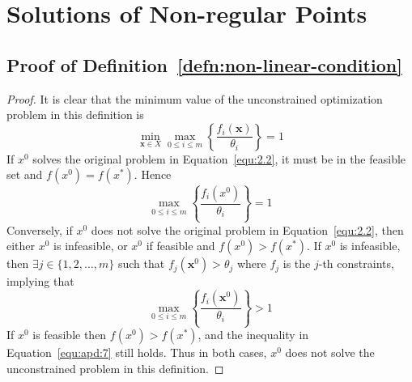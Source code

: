 \section{Solutions of Non-regular Points}
\subsection{Proof of Definition~\ref{defn:non-linear-condition}}
\label{appendix:defn5.1}
\begin{proof}
    It is clear that the minimum value of the unconstrained optimization problem in this definition is
    \begin{equation}
        \min _{\mathbf{x} \in X} \max _{0 \leq i \leq m}\left\{\frac{f_{i}(\mathbf{x})}{\theta_{i}}\right\}=1
    \end{equation}
    If $x^0$ solves the original problem in Equation~\ref{equ:2.2}, it must be in the feasible set and $f(x^0) = f(x^*)$. Hence
    \begin{equation}
        \max _{0 \leq i \leq m}\left\{\frac{f_{i}\left(x^{0}\right)}{\theta_{i}}\right\}=1
    \end{equation}
    Conversely, if $x^0$ does not solve the original problem in Equation~\ref{equ:2.2}, then either $x^0$ is infeasible, or $x^0$ if feasible and $f(x^0) > f(x^*)$. If $x^0$ is infeasible, then $\exists j \in\{1,2, \ldots, m\}$ such that $f_{j}\left(\mathbf{x}^{0}\right)>\theta_{j}$ where $f_j$ is the $j$-th constraints, implying that
    \begin{equation}
        \label{equ:apd:7}
        \max _{0 \leq i \leq m}\left\{\frac{f_{i}\left(\mathbf{x}^{0}\right)}{\theta_{i}}\right\}>1
    \end{equation}
    If $x^0$ is feasible then $f(x^0) > f(x^*)$, and the inequality in Equation~\ref{equ:apd:7} still holds. Thus in both cases, $x^0$ does not solve the unconstrained problem in this definition. 
\end{proof}
